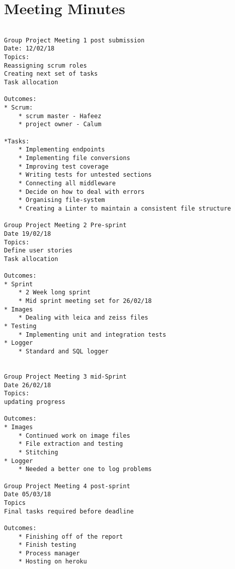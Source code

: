 \section{Meeting Minutes}\label{app:meet}
\begin{lstlisting}

Group Project Meeting 1 post submission
Date: 12/02/18
Topics:
Reassigning scrum roles
Creating next set of tasks
Task allocation

Outcomes:
* Scrum:
    * scrum master - Hafeez
    * project owner - Calum

*Tasks:
    * Implementing endpoints
    * Implementing file conversions
    * Improving test coverage
    * Writing tests for untested sections
    * Connecting all middleware
    * Decide on how to deal with errors
    * Organising file-system
    * Creating a Linter to maintain a consistent file structure

Group Project Meeting 2 Pre-sprint
Date 19/02/18
Topics:
Define user stories
Task allocation

Outcomes:
* Sprint
    * 2 Week long sprint
    * Mid sprint meeting set for 26/02/18
* Images
    * Dealing with leica and zeiss files
* Testing
    * Implementing unit and integration tests
* Logger
    * Standard and SQL logger


Group Project Meeting 3 mid-Sprint
Date 26/02/18
Topics:
updating progress

Outcomes:
* Images
    * Continued work on image files
    * File extraction and testing
    * Stitching
* Logger
    * Needed a better one to log problems

Group Project Meeting 4 post-sprint
Date 05/03/18
Topics
Final tasks required before deadline

Outcomes:
    * Finishing off of the report
    * Finish testing
    * Process manager
    * Hosting on heroku

\end{lstlisting}
